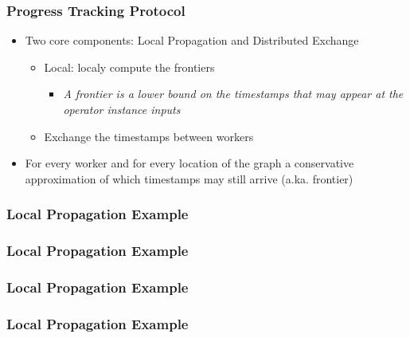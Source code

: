 \documentclass[aspectratio=169,10pt]{beamer}
\begin{document}
\begin{frame}
  \frametitle{Progress Tracking Protocol}
  \begin{itemize}
    \item Two core components: Local Propagation and Distributed Exchange
          \begin{itemize}
            \item Local: localy compute the frontiers
                  \begin{itemize}
                    \item \textit{A frontier is a lower bound on the timestamps that may appear at the operator instance inputs}
                  \end{itemize}
            \item Exchange the timestamps between workers
          \end{itemize}
          \pause
    \item For every worker and for every location of the graph a conservative approximation of which timestamps may still arrive (a.ka. frontier)
  \end{itemize}
\end{frame}

\begin{frame}
  \frametitle{Local Propagation Example}
  \begin{center}
    
  \end{center}
\end{frame}

\begin{frame}
  \frametitle{Local Propagation Example}
  \begin{center}
    
  \end{center}
\end{frame}

\begin{frame}
  \frametitle{Local Propagation Example}
  \begin{center}
    
  \end{center}
\end{frame}

\begin{frame}
  \frametitle{Local Propagation Example}
  \begin{center}
    
  \end{center}
\end{frame}
\end{document}
